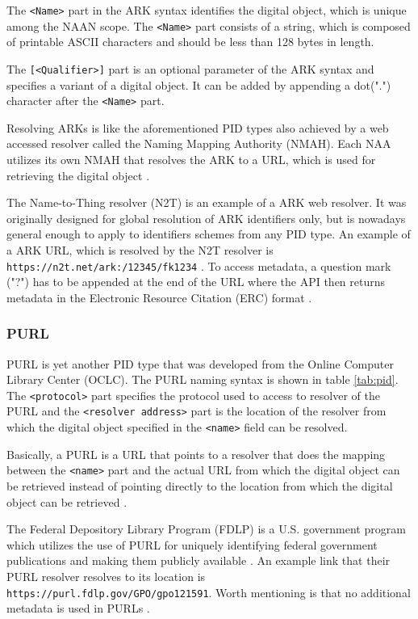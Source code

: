 The \texttt{<Name>} part in the ARK syntax identifies the digital object, which is unique among the NAAN scope. The \texttt{<Name>} part consists of a string, which is composed of printable ASCII characters and should be less than 128 bytes in length.

The \texttt{[<Qualifier>]} part is an optional parameter of the ARK syntax and specifies a variant of a digital object. It can be added by appending a dot(".") character after the \texttt{<Name>} part. 

Resolving ARKs is like the aforementioned PID types also achieved by a web accessed resolver called the Naming Mapping Authority (NMAH). 
Each NAA utilizes its own NMAH that resolves the ARK to a URL, which is used for retrieving the digital object \cite{icn-bd}.

The Name-to-Thing resolver (N2T) is an example of a ARK web resolver. It was originally designed for global resolution of ARK identifiers only, but is nowadays general enough to apply to identifiers schemes from any PID type. An example of a ARK URL, which is resolved by the N2T resolver is \texttt{https://n2t.net/ark:/12345/fk1234} \cite{n2t}. To access metadata, a question mark ("?") has to be appended at the end of the URL where the API then returns metadata in the Electronic Resource Citation (ERC) format \cite{ark-erc}. 

\subsubsection{PURL}
PURL is yet another PID type that was developed from the Online Computer Library Center (OCLC). The PURL naming syntax is shown in table \ref{tab:pid}. The \texttt{<protocol>} part specifies the protocol used to access to resolver of the PURL and the  \texttt{<resolver address>} part is the location of the resolver from which the digital object specified
in the \texttt{<name>} field can be resolved.

Basically, a PURL is a URL that points to a resolver that does the mapping
between the \texttt{<name>} part and the actual URL from which the digital object can be
retrieved instead of pointing directly to the location from
which the digital object can be retrieved \cite{icn-bd}.

The Federal Depository Library Program (FDLP) is a U.S. government program which utilizes the use of PURL for uniquely identifying federal government publications and making them publicly available \cite{purl-fdlp}. An example link that their PURL resolver resolves to its location is \texttt{https://purl.fdlp.gov/GPO/gpo121591}.
Worth mentioning is that no additional metadata is used in PURLs \cite{eudat-pid}.




